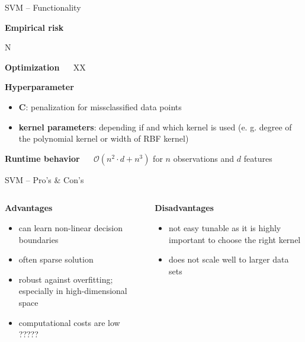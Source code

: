 \documentclass[11pt,compress,t,notes=noshow, xcolor=table]{beamer}
\newcommand{\highlight}[1]{\textcolor{highlightcol}{\textbf{#1}}}
\newcommand{\positem}{\item[$\highlight{+}$]}
\newcommand{\negitem}{\item[$\highlight{-}$]}
\newcommand{\conclbox}[1]{\fbox{\parbox{\textwidth}{\centering\textbf{#1}}}}
\begin{document}

\begin{frame}{SVM -- Functionality}

\footnotesize

\highlight{Empirical risk}

N

\medskip

\highlight{Optimization} ~~
XX

\medskip

\highlight{Hyperparameter}

\begin{itemize}
  \item \textbf{C}: penalization for missclassified data points 
  \item \textbf{kernel parameters}: depending if and which kernel is used (e. g. degree of the polynomial kernel or width of RBF kernel)

\end{itemize}

\medskip

\highlight{Runtime behavior} ~~ $\mathcal{O}(n^2 \cdot d + n^3)$ for $n$ 
observations and $d$ features

\end{frame}


\begin{frame}{SVM -- Pro's \& Con's}

\footnotesize


\begin{columns}[onlytextwidth]
  \begin{column}{0.5\textwidth}
    \highlight{Advantages}
    \footnotesize
    \begin{itemize}
      \positem can learn non-linear decision boundaries
      \positem often sparse solution
      \positem robust against overfitting; especially in high-dimensional space 
      \positem computational costs are low ????? 
    \end{itemize}
  \end{column}

  \begin{column}{0.5\textwidth}
    \highlight{Disadvantages}
    \footnotesize
    \begin{itemize}
      \negitem not easy tunable as it is highly important to choose the right kernel
      \negitem does not scale well to larger data sets
    \end{itemize}
  \end{column}
\end{columns}

\vfill

\small

\conclbox{XX}

\end{frame}
\end{document}
